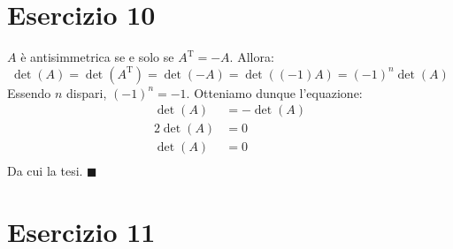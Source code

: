 \documentclass{article}
\newcommand*{\qed}{\blacksquare}
\newcommand*{\T}[1]{{#1}^\text{T}}  %
\begin{document}
\section*{Esercizio 10}
$A$ è antisimmetrica se e solo se $\T{A}=-A$. Allora:
\[
    \det(A) =
    \det\left(\T{A}\right) =
    \det(-A) =
    \det\left((-1)A\right) =
    (-1)^n \det(A)
\]
Essendo $n$ dispari, $(-1)^n = -1$. Otteniamo dunque l'equazione:
\[\begin{aligned}
    \det(A) &= -\det(A) \\
    2 \det(A) &= 0 \\
    \det(A) &= 0 \\
\end{aligned}\]
Da cui la tesi. $\qed$

\section*{Esercizio 11}
\end{document}
